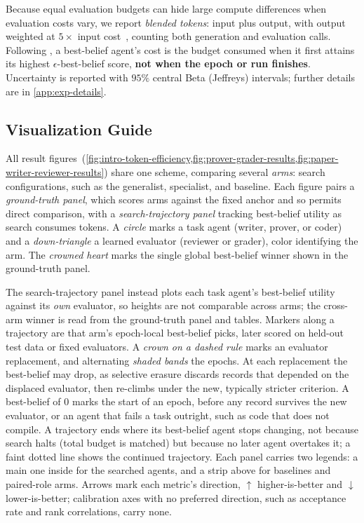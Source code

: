 Because equal evaluation budgets can hide large compute differences when evaluation costs vary, we report \emph{blended tokens}: input plus output, with output weighted at $5\times$ input cost~\citep{openai2026pricing,anthropic2026pricing}, counting both generation and evaluation calls. Following \citet{wang2025huxley}, a best-belief agent's cost is the budget consumed when it first attains its highest $\epsilon$-best-belief score, \textbf{not when the epoch or run finishes}. Uncertainty is reported with $95\%$ central Beta (Jeffreys) intervals; further details are in \cref{app:exp-details}.

\subsection{Visualization Guide}
\label{exp_design:reading_results_figures}
All result figures~(\cref{fig:intro-token-efficiency,fig:prover-grader-results,fig:paper-writer-reviewer-results}) share one scheme, comparing several \emph{arms}: search configurations, such as the \ourmethod generalist, specialist, and \hgmh baseline. Each figure pairs a \emph{ground-truth panel}, which scores arms against the fixed anchor and so permits direct comparison, with a \emph{search-trajectory panel} tracking best-belief utility as search consumes tokens. A \emph{circle} marks a task agent (writer, prover, or coder) and a \emph{down-triangle} a learned evaluator (reviewer or grader), color identifying the arm. The \emph{crowned heart} marks the single global best-belief winner shown in the ground-truth panel.

The search-trajectory panel instead plots each task agent's best-belief utility against its \emph{own} evaluator, so heights are not comparable across arms; the cross-arm winner is read from the ground-truth panel and tables. Markers along a trajectory are that arm's epoch-local best-belief picks, later scored on held-out test data or fixed evaluators. A \emph{crown on a dashed rule} marks an evaluator replacement, and alternating \emph{shaded bands} the epochs. At each replacement the best-belief may drop, as selective erasure discards records that depended on the displaced evaluator, then re-climbs under the new, typically stricter criterion. A best-belief of $0$ marks the start of an epoch, before any record survives the new evaluator, or an agent that fails a task outright, such as code that does not compile. A trajectory ends where its best-belief agent stops changing, not because search halts (total budget is matched) but because no later agent overtakes it; a faint dotted line shows the continued trajectory. Each panel carries two legends: a main one inside for the searched agents, and a strip above for baselines and paired-role arms. Arrows mark each metric's direction, $\boldsymbol{\uparrow}$ higher-is-better and $\boldsymbol{\downarrow}$ lower-is-better; calibration axes with no preferred direction, such as acceptance rate and rank correlations, carry none.
